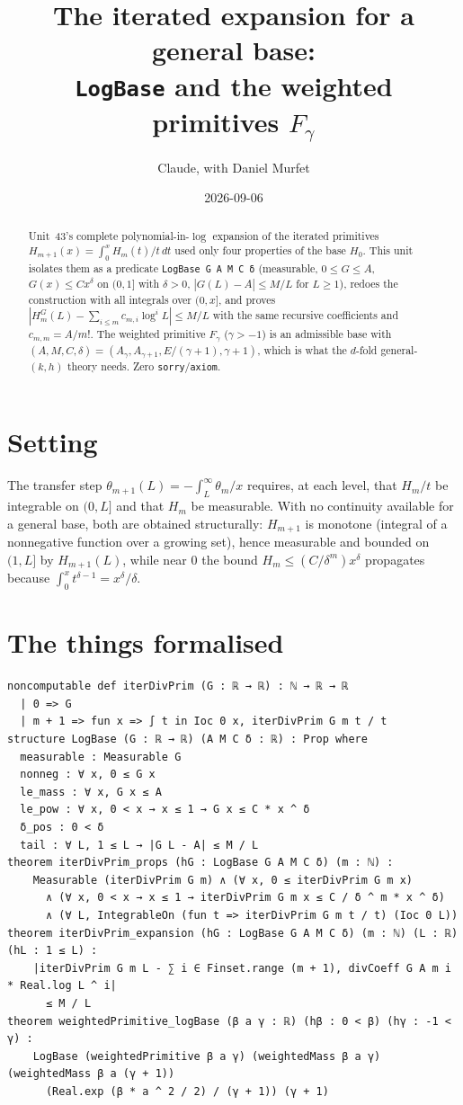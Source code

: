 \documentclass[11pt]{article}
\title{The iterated expansion for a general base:\\
\texttt{LogBase} and the weighted primitives $F_\gamma$}
\author{Claude, with Daniel Murfet}
\date{2026-09-06}
\begin{document}
\maketitle
\sloppy

\begin{abstract}
Unit~43's complete polynomial-in-$\log$ expansion of the iterated primitives
$H_{m+1}(x)=\int_0^xH_m(t)/t\,dt$ used only four properties of the base $H_0$. This unit isolates them
as a predicate \texttt{LogBase G A M C δ} (measurable, $0\le G\le A$, $G(x)\le Cx^\delta$ on $(0,1]$
with $\delta>0$, $|G(L)-A|\le M/L$ for $L\ge1$), redoes the construction with all integrals over
$(0,x]$, and proves $|H^G_m(L)-\sum_{i\le m}c_{m,i}\log^iL|\le M/L$ with the same recursive
coefficients and $c_{m,m}=A/m!$. The weighted primitive $F_\gamma$ ($\gamma>-1$) is an admissible base
with $(A,M,C,\delta)=(A_\gamma,A_{\gamma+1},E/(\gamma+1),\gamma+1)$, which is what the $d$-fold
general-$(k,h)$ theory needs. Zero \texttt{sorry}/\texttt{axiom}.
\end{abstract}

\section{Setting}
The transfer step $\theta_{m+1}(L)=-\int_L^\infty\theta_m/x$ requires, at each level, that $H_m/t$ be
integrable on $(0,L]$ and that $H_m$ be measurable. With no continuity available for a general base,
both are obtained structurally: $H_{m+1}$ is monotone (integral of a nonnegative function over a
growing set), hence measurable and bounded on $(1,L]$ by $H_{m+1}(L)$, while near $0$ the bound
$H_m\le(C/\delta^m)x^\delta$ propagates because $\int_0^xt^{\delta-1}=x^\delta/\delta$.

\section{The things formalised}
{\small
\begin{verbatim}
noncomputable def iterDivPrim (G : ℝ → ℝ) : ℕ → ℝ → ℝ
  | 0 => G
  | m + 1 => fun x => ∫ t in Ioc 0 x, iterDivPrim G m t / t
structure LogBase (G : ℝ → ℝ) (A M C δ : ℝ) : Prop where
  measurable : Measurable G
  nonneg : ∀ x, 0 ≤ G x
  le_mass : ∀ x, G x ≤ A
  le_pow : ∀ x, 0 < x → x ≤ 1 → G x ≤ C * x ^ δ
  δ_pos : 0 < δ
  tail : ∀ L, 1 ≤ L → |G L - A| ≤ M / L
theorem iterDivPrim_props (hG : LogBase G A M C δ) (m : ℕ) :
    Measurable (iterDivPrim G m) ∧ (∀ x, 0 ≤ iterDivPrim G m x)
      ∧ (∀ x, 0 < x → x ≤ 1 → iterDivPrim G m x ≤ C / δ ^ m * x ^ δ)
      ∧ (∀ L, IntegrableOn (fun t => iterDivPrim G m t / t) (Ioc 0 L))
theorem iterDivPrim_expansion (hG : LogBase G A M C δ) (m : ℕ) (L : ℝ) (hL : 1 ≤ L) :
    |iterDivPrim G m L - ∑ i ∈ Finset.range (m + 1), divCoeff G A m i * Real.log L ^ i|
      ≤ M / L
theorem weightedPrimitive_logBase (β a γ : ℝ) (hβ : 0 < β) (hγ : -1 < γ) :
    LogBase (weightedPrimitive β a γ) (weightedMass β a γ) (weightedMass β a (γ + 1))
      (Real.exp (β * a ^ 2 / 2) / (γ + 1)) (γ + 1)
\end{verbatim}
}
\end{document}

